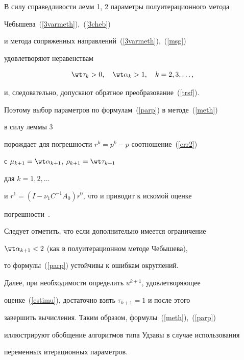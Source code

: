 \begin{pf}


В силу справедливости лемм 1, 2 параметры полуитерационного метода


Чебышева~(\ref{3varmeth}),~(\ref{3cheb})


и метода сопряженных направлений~(\ref{3varmeth}),~(\ref{msg})


удовлетворяют неравенствам


$$


\wt \tau_k > 0, \quad \wt \alpha_k > 1, \quad k = 2, 3, \dotsc,


$$


и, следовательно, допускают обратное преобразование~(\ref{trsf}).


Поэтому выбор параметров по формулам~(\ref{parp}) в методе~(\ref{meth})


в силу леммы 3


порождает для погрешности $r^k = p^k - p$ соотношение~(\ref{err2})


с $\mu_{k+1} = \wt \alpha_{k+1}$, $\rho_{k+1} = \wt \tau_{k+1}$


для $ k = 1, 2, \dotsc$


и $r^1 = ( I - \nu_1 C^{-1}A_0)r^0$, что и приводит к искомой оценке


погрешности~\cite{SamNik}.


\end{pf}





Следует отметить, что если дополнительно имеется ограничение


$\wt \alpha_{k+1} < 2$ (как в полуитерационном методе Чебышева),


то формулы~(\ref{parp}) устойчивы к ошибкам округлений.





Далее, при необходимости определить $u^{k+1}$, удовлетворяющее


оценке~(\ref{estimu}), достаточно взять $\tau_{k+1}=1$ и после этого


завершить вычисления. Таким образом, формулы~(\ref{meth}),~(\ref{parp})


иллюстрируют обобщение алгоритмов типа Удзавы в случае использования


переменных итерационных параметров.


\medskip






